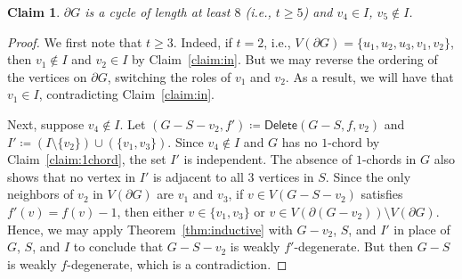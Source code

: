 \documentclass[11pt]{article}
\theoremstyle{slantthm}
\newtheorem{claim}{Claim}%
\newtheorem{case}{Case}%
\numberwithin{equation}{section}
\theoremstyle{definition}
\renewcommand{\geq}{\geqslant}
\newcommand{\defeq}{\coloneqq}
\newcommand{\bemph}[1]{{\normalfont#1}}
\newcommand{\ep}[1]{\bemph{(}#1\bemph{)}}
\numberwithin{equation}{section}
\newcommand{\0}{\varnothing}
\newcommand{\set}[1]{\{#1\}}
\newcommand{\del}{\mathsf{Delete}}
\newcommand{\bdry}[1]{{\partial #1}}
\begin{document}

%       

    \begin{claim}\label{claim:8}
        $\partial G$ is a cycle of length at least $8$ \ep{i.e., $t \geq 5$} and $v_4 \in I$, $v_5 \notin I$.
    \end{claim}
    \begin{proof}
        We first note that $t \geq 3$. Indeed, if $t = 2$, i.e., $V(\bdry{G}) = \set{u_1, u_2, u_3, v_1, v_2}$, then $v_1 \notin I$ and $v_2 \in I$ by Claim~\ref{claim:in}. But we may reverse the ordering of the vertices on $\bdry{G}$, switching the roles of $v_1$ and $v_2$. As a result, we will have that $v_1 \in I$, contradicting Claim~\ref{claim:in}.
        
        Next, suppose $v_4 \notin I$. %
        Let $(G - S - v_2, f') \defeq \del(G-S, f, v_2)$ %
        and $I' \defeq (I \setminus \{v_2\}) \cup (\{v_1, v_3\})$. %
        Since $v_4 \notin I$ and $G$ has no $1$-chord by Claim~\ref{claim:1chord}, the set $I'$ is independent. The absence of $1$-chords in $G$ also shows that no vertex in $I'$ is adjacent to all $3$ vertices in $S$. Since the only neighbors of $v_2$ in $V(\bdry{G})$ are $v_1$ and $v_3$, if $v \in V(G - S - v_2)$ satisfies $f'(v) = f(v) - 1$, then either $v \in \set{v_1, v_3}$ or $v \in V(\bdry{(G - v_2)}) \setminus V(\bdry{G})$. Hence, we may apply Theorem~\ref{thm:inductive} with $G - v_2$, $S$, and $I'$ in place of $G$, $S$, and $I$ to conclude that $G - S - v_2$ is weakly $f'$-degenerate. But then $G - S$ is weakly $f$-degenerate, which is a contradiction.


\end{proof}
\end{document}
